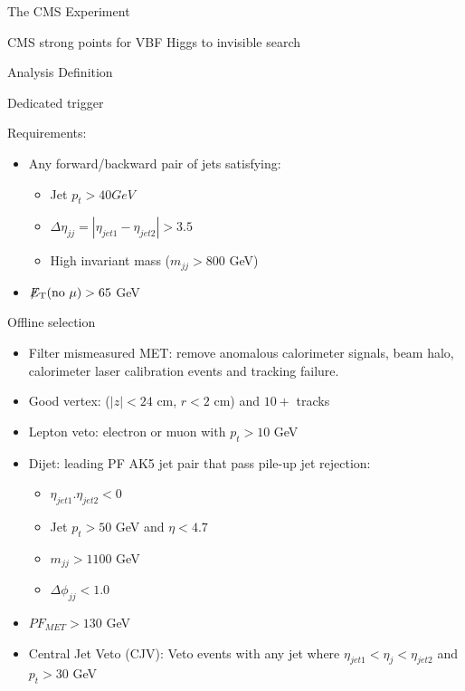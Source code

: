 \documentclass[8pt]{beamer}
\newcommand{\met}{\displaystyle{\not} E_{\rm T}}
\begin{document}
\begin{frame}{The CMS Experiment}
\begin{block}{CMS strong points for VBF Higgs to invisible search}
\end{block}

\end{frame}

\begin{frame}{Analysis Definition}
 
\begin{block}{Dedicated trigger}
 
Requirements:
\begin{itemize}
 \item Any forward/backward pair of jets satisfying:
 \begin{itemize}
  \item Jet $p_t>40 GeV$
  \item $\Delta\eta_{jj} = | \eta_{jet1} - \eta_{jet2}| > 3.5$
  \item High invariant mass ($m_{jj}>800$ GeV)
 \end{itemize}
 \item $\met(\text{no }\mu)>65$ GeV
\end{itemize}
 
\end{block}

\begin{block}{Offline selection}
 
\begin{itemize}
 \item Filter mismeasured MET: remove anomalous calorimeter signals, beam halo, calorimeter laser calibration events and tracking failure. 
 \item Good vertex: ($|z|<24$ cm, $r<2$ cm) and $10+$ tracks
 \item Lepton veto: electron or muon with $p_t>10$ GeV
 
 \item Dijet: leading PF AK5 jet pair that pass pile-up jet rejection:
 \begin{itemize}
  \item $\eta_{jet1} . \eta_{jet2} < 0$
  \item Jet $p_t > 50$ GeV and $\eta < 4.7$
  \item $m_{jj}>1100$ GeV
  \item $\Delta\phi_{jj} < 1.0$
 \end{itemize}

 \item $PF_{MET} > 130$ GeV
 
 \item Central Jet Veto (CJV): Veto events with any jet where $\eta_{jet1} < \eta_{j} < \eta_{jet2}$ and $p_t>30$ GeV
 
\end{itemize}
 
 
\end{block}
 
\end{frame}
\end{document}
